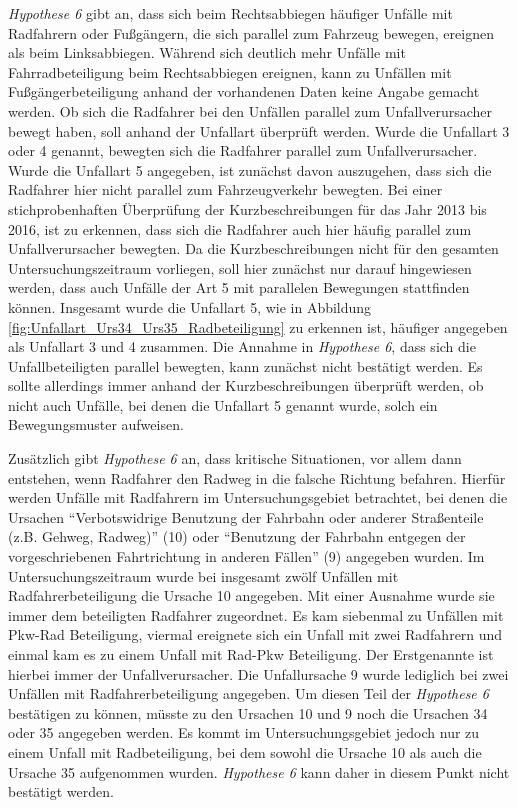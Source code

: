 \textit{Hypothese 6} gibt an, dass sich beim Rechtsabbiegen häufiger Unfälle mit Radfahrern oder Fußgängern, die sich parallel zum Fahrzeug bewegen, ereignen als beim Linksabbiegen. Während sich deutlich mehr Unfälle mit Fahrradbeteiligung beim Rechtsabbiegen ereignen, kann zu Unfällen mit Fußgängerbeteiligung anhand der vorhandenen Daten keine Angabe gemacht werden. Ob sich die Radfahrer bei den Unfällen parallel zum Unfallverursacher bewegt haben, soll anhand der Unfallart überprüft werden. Wurde die Unfallart 3 oder 4 genannt, bewegten sich die Radfahrer parallel zum Unfallverursacher. Wurde die Unfallart 5 angegeben, ist zunächst davon auszugehen, dass sich die Radfahrer hier nicht parallel zum Fahrzeugverkehr bewegten. Bei einer stichprobenhaften Überprüfung der Kurzbeschreibungen für das Jahr 2013 bis 2016, ist zu erkennen, dass sich die Radfahrer auch hier häufig parallel zum Unfallverursacher bewegten. Da die Kurzbeschreibungen nicht für den gesamten Untersuchungszeitraum vorliegen, soll hier zunächst nur darauf hingewiesen werden, dass auch Unfälle der Art 5 mit parallelen Bewegungen stattfinden können. Insgesamt wurde die Unfallart 5, wie in Abbildung \ref{fig:Unfallart_Urs34_Urs35_Radbeteiligung} zu erkennen ist, häufiger angegeben als Unfallart 3 und 4 zusammen. Die Annahme in \textit{Hypothese 6}, dass sich die Unfallbeteiligten parallel bewegten, kann zunächst nicht bestätigt werden. Es sollte allerdings immer anhand der Kurzbeschreibungen überprüft werden, ob nicht auch Unfälle, bei denen die Unfallart 5 genannt wurde, solch ein Bewegungsmuster aufweisen.

Zusätzlich gibt \textit{Hypothese 6} an, dass kritische Situationen, vor allem dann entstehen, wenn Radfahrer den Radweg in die falsche Richtung befahren. Hierfür werden Unfälle mit Radfahrern im Untersuchungsgebiet betrachtet, bei denen die Ursachen \enquote{Verbotswidrige Benutzung der Fahrbahn oder anderer Straßenteile (z.B. Gehweg, Radweg)} (10) oder \enquote{Benutzung der Fahrbahn entgegen der vorgeschriebenen Fahrtrichtung in anderen Fällen} (9) angegeben wurden. Im Untersuchungszeitraum wurde bei insgesamt zwölf Unfällen mit Radfahrerbeteiligung die Ursache 10 angegeben. Mit einer Ausnahme wurde sie immer dem beteiligten Radfahrer zugeordnet. Es kam siebenmal zu Unfällen mit Pkw-Rad Beteiligung, viermal ereignete sich ein Unfall mit zwei Radfahrern und einmal kam es zu einem Unfall mit Rad-Pkw Beteiligung. Der Erstgenannte ist hierbei immer der Unfallverursacher. Die Unfallursache 9 wurde lediglich bei zwei Unfällen mit Radfahrerbeteiligung angegeben. Um diesen Teil der \textit{Hypothese 6} bestätigen zu können, müsste zu den Ursachen 10 und 9 noch die Ursachen 34 oder 35 angegeben werden. Es kommt im Untersuchungsgebiet jedoch nur zu einem Unfall mit Radbeteiligung, bei dem sowohl die Ursache 10 als auch die Ursache 35 aufgenommen wurden. \textit{Hypothese 6} kann daher in diesem Punkt nicht bestätigt werden.

